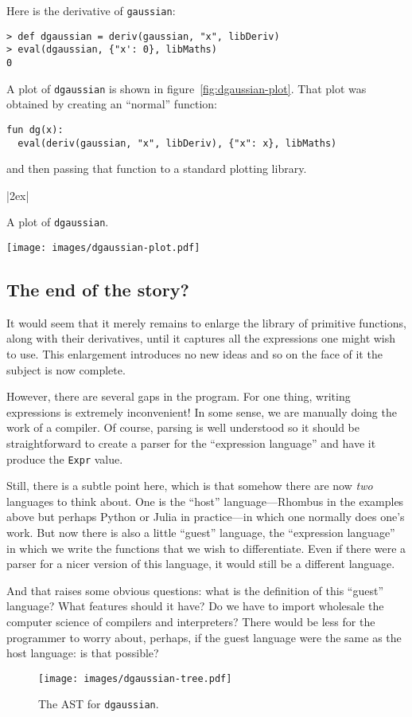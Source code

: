 \documentclass[11pt, a4paper]{article}
\newcommand{\cd}[1]{\texttt{#1}}
\begin{document}
Here is the derivative of \cd{gaussian}:
\begin{verbatim}
> def dgaussian = deriv(gaussian, "x", libDeriv)
> eval(dgaussian, {"x': 0}, libMaths)
0
\end{verbatim}
A plot of \cd{dgaussian} is shown in figure~\ref{fig:dgaussian-plot}.
That plot was obtained by creating an ``normal'' function:
\begin{verbatim}
fun dg(x):
  eval(deriv(gaussian, "x", libDeriv), {"x": x}, libMaths)
\end{verbatim}
and then passing that function to a standard plotting library.
\begin{marginfigure}|2ex|
  \caption{A plot of \cd{dgaussian}.\label{fig:dgaussian-plot}}
  \centering
  \texttt{[image: images/dgaussian-plot.pdf]}
\end{marginfigure}
  
\subsection{The end of the story?}

It would seem that it merely remains to enlarge the library of
primitive functions, along with their derivatives, until it captures
all the expressions one might wish to use. This enlargement introduces
no new ideas and so on the face of it the subject is now complete.

However, there are several gaps in the program. For one thing, writing
expressions is extremely inconvenient! In some sense, we are manually
doing the work of a compiler. Of course, parsing is well understood so
it should be straightforward to create a parser for the ``expression
language'' and have it produce the \cd{Expr} value.

Still, there is a subtle point here, which is that somehow there are
now \emph{two} languages to think about. One is the ``host''
language---Rhombus in the examples above but perhaps Python or Julia in
practice---in which one normally does one's work. But now there is also
a little ``guest'' language, the ``expression language'' in which we
write the functions that we wish to differentiate. Even if there were
a parser for a nicer version of this language, it would still be a
different language.

And that raises some obvious questions: what is the definition of this
``guest'' language? What features should it have? Do we have to import
wholesale the computer science of compilers and interpreters?  There
would be less for the programmer to worry about, perhaps, if the guest
language were the same as the host language: is that possible?
\begin{figure}[ht]
  \caption{The AST for \cd{dgaussian}.\label{fig:dgaussian-tree}}
  \centering
  \texttt{[image: images/dgaussian-tree.pdf]}
\end{figure}
\end{document}
